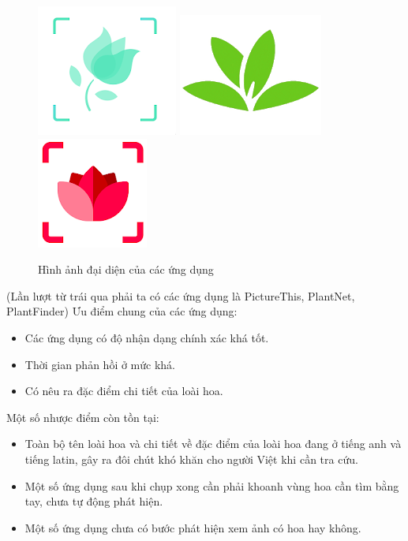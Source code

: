 \documentclass[12pt]{report}
\begin{document}
		\begin{figure}[h]
			\centering
			\includegraphics[scale=0.7]{picture_this_app}
			\includegraphics[scale=0.7]{plantnet_app}
			\includegraphics[scale=0.7]{plantfinder_app}
			\caption{Hình ảnh đại diện của các ứng dụng}
			\label{fig:app_curent}
		\end{figure}
		(Lần lượt từ trái qua phải ta có các ứng dụng là PictureThis, PlantNet, PlantFinder)
		Ưu điểm chung của các ứng dụng:
		\begin{itemize}
			\item Các ứng dụng có độ nhận dạng chính xác khá tốt.
			\item Thời gian phản hồi ở mức khá.
			\item Có nêu ra đặc điểm chi tiết của loài hoa.
		\end{itemize}
		Một số nhược điểm còn tồn tại:
		\begin{itemize}
			\item Toàn bộ tên loài hoa và chi tiết về đặc điểm của loài hoa đang ở tiếng anh và tiếng latin, gây ra đôi chút khó khăn cho người Việt khi cần tra cứu.
			\item Một số ứng dụng sau khi chụp xong cần phải khoanh vùng hoa cần tìm bằng tay, chưa tự động phát hiện.
			\item Một số ứng dụng chưa có bước phát hiện xem ảnh có hoa hay không.
		\end{itemize}
														
\end{document}
